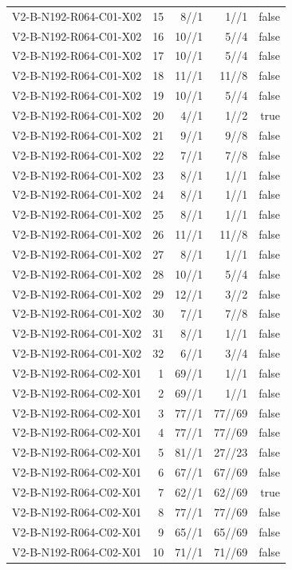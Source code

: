 {\begin{longtable}{lrrrr}
V2-B-N192-R064-C01-X02 & 15 & 8//1 & 1//1 & false \\
V2-B-N192-R064-C01-X02 & 16 & 10//1 & 5//4 & false \\
V2-B-N192-R064-C01-X02 & 17 & 10//1 & 5//4 & false \\
V2-B-N192-R064-C01-X02 & 18 & 11//1 & 11//8 & false \\
V2-B-N192-R064-C01-X02 & 19 & 10//1 & 5//4 & false \\
V2-B-N192-R064-C01-X02 & 20 & 4//1 & 1//2 & true \\
V2-B-N192-R064-C01-X02 & 21 & 9//1 & 9//8 & false \\
V2-B-N192-R064-C01-X02 & 22 & 7//1 & 7//8 & false \\
V2-B-N192-R064-C01-X02 & 23 & 8//1 & 1//1 & false \\
V2-B-N192-R064-C01-X02 & 24 & 8//1 & 1//1 & false \\
V2-B-N192-R064-C01-X02 & 25 & 8//1 & 1//1 & false \\
V2-B-N192-R064-C01-X02 & 26 & 11//1 & 11//8 & false \\
V2-B-N192-R064-C01-X02 & 27 & 8//1 & 1//1 & false \\
V2-B-N192-R064-C01-X02 & 28 & 10//1 & 5//4 & false \\
V2-B-N192-R064-C01-X02 & 29 & 12//1 & 3//2 & false \\
V2-B-N192-R064-C01-X02 & 30 & 7//1 & 7//8 & false \\
V2-B-N192-R064-C01-X02 & 31 & 8//1 & 1//1 & false \\
V2-B-N192-R064-C01-X02 & 32 & 6//1 & 3//4 & false \\
V2-B-N192-R064-C02-X01 & 1 & 69//1 & 1//1 & false \\
V2-B-N192-R064-C02-X01 & 2 & 69//1 & 1//1 & false \\
V2-B-N192-R064-C02-X01 & 3 & 77//1 & 77//69 & false \\
V2-B-N192-R064-C02-X01 & 4 & 77//1 & 77//69 & false \\
V2-B-N192-R064-C02-X01 & 5 & 81//1 & 27//23 & false \\
V2-B-N192-R064-C02-X01 & 6 & 67//1 & 67//69 & false \\
V2-B-N192-R064-C02-X01 & 7 & 62//1 & 62//69 & true \\
V2-B-N192-R064-C02-X01 & 8 & 77//1 & 77//69 & false \\
V2-B-N192-R064-C02-X01 & 9 & 65//1 & 65//69 & false \\
V2-B-N192-R064-C02-X01 & 10 & 71//1 & 71//69 & false \\

\end{longtable}}
